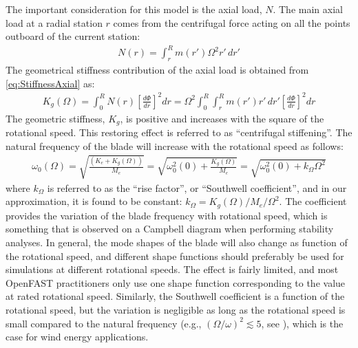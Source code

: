 \documentclass[wes, manuscript]{copernicus}
\begin{document}
The important consideration for this model is the axial load, $N$.
The main axial load at a radial station $r$ comes from the centrifugal force acting on all the points outboard of the current station:
\begin{align}
    N(r)=\int_r^R m(r') \Omega^2  r' \, dr'
\end{align}
The geometrical stiffness contribution of the axial load is obtained from \autoref{eq:StiffnessAxial} as:
\begin{align}
    K_g(\Omega) = \int_0^R N(r) \left[\frac{d\Phi}{dr} \right]^2  dr  
    = \Omega^2 \int_0^R \int_r^R m(r') r' \, dr'
 \left[\frac{d\Phi}{dr} \right]^2 dr  
 \label{eq:GeomStiffCentri}
\end{align}
% 
The geometric stiffness, $K_g$, is positive and increases with the square of the rotational speed. 
This restoring effect is referred to as ``centrifugal stiffening''.
The natural frequency of the blade will increase with the rotational speed as follows:
\begin{align}
   \omega_0(\Omega)=\sqrt{\frac{(K_{e}+ K_g(\Omega))}{M_e}} 
   = \sqrt{ \omega_0^2(0) + \frac{K_g(\Omega)}{M_e} } 
   = \sqrt{ \omega_0^2(0) +  k_\Omega \Omega^2 } 
\end{align}
where $k_\Omega$ is referred to as the ``rise factor'', or ``Southwell coefficient'', and in our approximation, it is found to be constant: $k_\Omega=K_g(\Omega)/M_e/\Omega^2$.
The coefficient provides the variation of the blade frequency with rotational speed, which is something that is observed on a Campbell diagram when performing stability analyses.
In general, the mode shapes of the blade will also change as function of the rotational speed, and different shape functions should preferably be used for simulations at different rotational speeds.
The effect is fairly limited, and most OpenFAST practitioners only use one shape function corresponding to the value at rated rotational speed.
Similarly, the Southwell coefficient is a function of the rotational speed, but the variation is negligible as long as the rotational speed is small compared to the natural frequency (e.g., $(\Omega/\omega)^2 \lesssim 5$, see \cite{bielawa:2006:book}), which is the case for wind energy applications.
\end{document}
